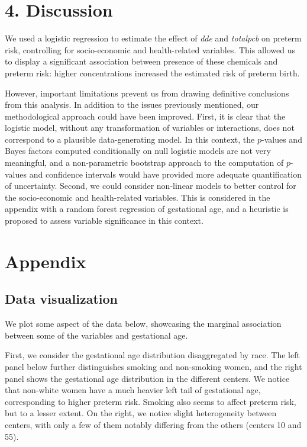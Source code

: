 \documentclass[10pt,]{article}
\begin{document}
\hypertarget{discussion}{%
\section{4. Discussion}\label{discussion}}

We used a logistic regression to estimate the effect of \emph{dde} and
\emph{totalpcb} on preterm risk, controlling for socio-economic and
health-related variables. This allowed us to display a significant
association between presence of these chemicals and preterm risk: higher
concentrations increased the estimated risk of preterm birth.

However, important limitations prevent us from drawing definitive
conclusions from this analysis. In addition to the issues previously
mentioned, our methodological approach could have been improved. First,
it is clear that the logistic model, without any transformation of
variables or interactions, does not correspond to a plausible
data-generating model. In this context, the \(p\)-values and Bayes
factors computed conditionally on null logistic models are not very
meaningful, and a non-parametric bootstrap approach to the computation
of \(p\)-values and confidence intervals would have provided more
adequate quantification of uncertainty. Second, we could consider
non-linear models to better control for the socio-economic and
health-related variables. This is considered in the appendix with a
random forest regression of gestational age, and a heuristic is proposed
to assess variable significance in this context.

\newpage

\hypertarget{appendix}{%
\section{Appendix}\label{appendix}}

\hypertarget{data-visualization}{%
\subsection{Data visualization}\label{data-visualization}}

We plot some aspect of the data below, showcasing the marginal
association between some of the variables and gestational age.

First, we consider the gestational age distribution disaggregated by
race. The left panel below further distinguishes smoking and non-smoking
women, and the right panel shows the gestational age distribution in the
different centers. We notice that non-white women have a much heavier
left tail of gestational age, corresponding to higher preterm risk.
Smoking also seems to affect preterm risk, but to a lesser extent. On
the right, we notice slight heterogeneity between centers, with only a
few of them notably differing from the others (centers 10 and 55).
\end{document}
